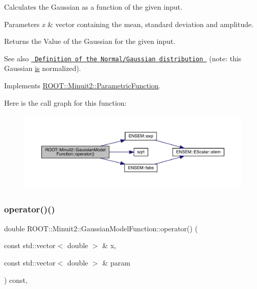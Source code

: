 Calculates the Gaussian as a function of the given input.


\begin{DoxyParams}{Parameters}
{\em x} & vector containing the mean, standard deviation and amplitude.\\
\hline
\end{DoxyParams}
\begin{DoxyReturn}{Returns}
the Value of the Gaussian for the given input.
\end{DoxyReturn}
\begin{DoxySeeAlso}{See also}
\href{http://mathworld.wolfram.com/NormalDistribution.html}{\texttt{ Definition of the Normal/\+Gaussian distribution }} (note\+: this Gaussian \mbox{\hyperlink{x_8cc_a81abbbdef81e25584a2eab888e643d3d}{is}} normalized). 
\end{DoxySeeAlso}


Implements \mbox{\hyperlink{classROOT_1_1Minuit2_1_1ParametricFunction_a953426fa51c84cdef3eba24274131806}{R\+O\+O\+T\+::\+Minuit2\+::\+Parametric\+Function}}.

Here is the call graph for this function\+:\nopagebreak
\begin{figure}[H]
\begin{center}
\leavevmode
\includegraphics[width=350pt]{d4/df6/classROOT_1_1Minuit2_1_1GaussianModelFunction_af4102c5eecd496d63c5592f7519248ce_cgraph}
\end{center}
\end{figure}
\mbox{\label{classROOT_1_1Minuit2_1_1GaussianModelFunction_ab74ced8f50ef3831c8142de54877e726}} 
\subsubsection{\texorpdfstring{operator()()}{operator()()}\hspace{0.1cm}{\footnotesize\ttfamily [2/2]}}
{\footnotesize\ttfamily double R\+O\+O\+T\+::\+Minuit2\+::\+Gaussian\+Model\+Function\+::operator() (\begin{DoxyParamCaption}\item[{const std\+::vector$<$ double $>$ \&}]{x,  }\item[{const std\+::vector$<$ double $>$ \&}]{param }\end{DoxyParamCaption}) const\hspace{0.3cm}{\ttfamily [inline]}, {\ttfamily [virtual]}}

